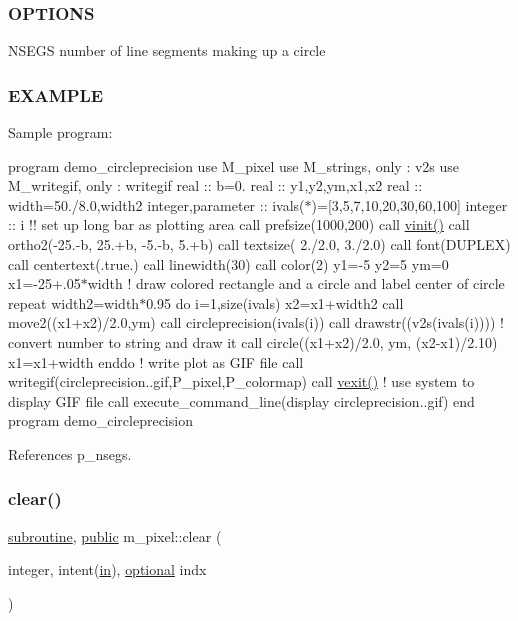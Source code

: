 \subsubsection*{O\+P\+T\+I\+O\+NS}

N\+S\+E\+GS number of line segments making up a circle

\subsubsection*{E\+X\+A\+M\+P\+LE}

Sample program\+:

program demo\+\_\+circleprecision use M\+\_\+pixel use M\+\_\+strings, only \+: v2s use M\+\_\+writegif, only \+: writegif real \+:\+: b=0. real \+:\+: y1,y2,ym,x1,x2 real \+:\+: width=50./8.0,width2 integer,parameter \+:\+: ivals($\ast$)=\mbox{[}3,5,7,10,20,30,60,100\mbox{]} integer \+:\+: i !! set up long bar as plotting area call prefsize(1000,200) call \hyperlink{namespacem__pixel_ac03ca8f23fdadb60599b6ea4dc87a6d9}{vinit()} call ortho2(-\/25.-\/b, 25.+b, -\/5.-\/b, 5.+b) call textsize( 2./2.0, 3./2.0) call font(\textquotesingle{}D\+U\+P\+L\+EX\textquotesingle{}) call centertext(.true.) call linewidth(30) call color(2) y1=-\/5 y2=5 ym=0 x1=-\/25+.05$\ast$width ! draw colored rectangle and a circle and label center of circle repeat width2=width$\ast$0.95 do i=1,size(ivals) x2=x1+width2 call move2((x1+x2)/2.0,ym) call circleprecision(ivals(i)) call drawstr((v2s(ivals(i)))) ! convert number to string and draw it call circle((x1+x2)/2.0, ym, (x2-\/x1)/2.10) x1=x1+width enddo ! write plot as G\+IF file call writegif(\textquotesingle{}circleprecision..\+gif\textquotesingle{},P\+\_\+pixel,P\+\_\+colormap) call \hyperlink{namespacem__pixel_a19ad6b65752322b0029a62cc0ebec3e8}{vexit()} ! use system to display G\+IF file call execute\+\_\+command\+\_\+line(\textquotesingle{}display circleprecision..\+gif\textquotesingle{}) end program demo\+\_\+circleprecision 

References p\+\_\+nsegs.

\mbox{\label{namespacem__pixel_af3b81a21a0b2f6b5eddd09c031bd6173}} 
\subsubsection{\texorpdfstring{clear()}{clear()}}
{\footnotesize\ttfamily \hyperlink{M__stopwatch_83_8txt_acfbcff50169d691ff02d4a123ed70482}{subroutine}, \hyperlink{M__stopwatch_83_8txt_a2f74811300c361e53b430611a7d1769f}{public} m\+\_\+pixel\+::clear (\begin{DoxyParamCaption}\item[{integer, intent(\hyperlink{M__journal_83_8txt_afce72651d1eed785a2132bee863b2f38}{in}), \hyperlink{option__stopwatch_83_8txt_aa4ece75e7acf58a4843f70fe18c3ade5}{optional}}]{indx }\end{DoxyParamCaption})}



